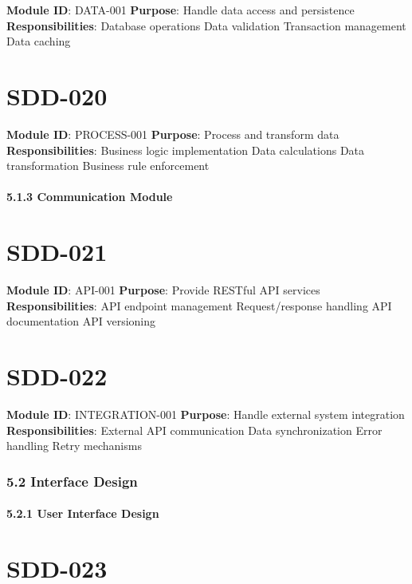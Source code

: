 \textbf{Module ID}: DATA-001
\textbf{Purpose}: Handle data access and persistence
\textbf{Responsibilities}:
Database operations
Data validation
Transaction management
Data caching

\section{SDD-020}\label{SDD-020}

\textbf{Module ID}: PROCESS-001
\textbf{Purpose}: Process and transform data
\textbf{Responsibilities}:
Business logic implementation
Data calculations
Data transformation
Business rule enforcement\\

\paragraph{5.1.3 Communication Module}

\section{SDD-021}\label{SDD-021}

\textbf{Module ID}: API-001
\textbf{Purpose}: Provide RESTful API services
\textbf{Responsibilities}:
API endpoint management
Request/response handling
API documentation
API versioning

\section{SDD-022}\label{SDD-022}

\textbf{Module ID}: INTEGRATION-001
\textbf{Purpose}: Handle external system integration
\textbf{Responsibilities}:
External API communication
Data synchronization
Error handling
Retry mechanisms\\

\subsubsection{5.2 Interface Design}

\paragraph{5.2.1 User Interface Design}

\section{SDD-023}\label{SDD-023}

